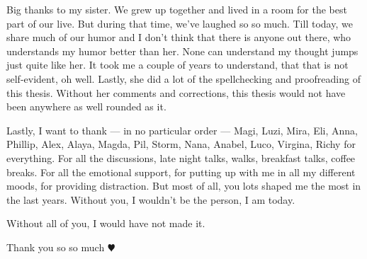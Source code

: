 Big thanks to my sister. We grew up together and lived in a room for the best part of our live. But
during that time, we've laughed so so much. Till today, we share much of our humor and I don't think
that there is anyone out there, who understands my humor better than her. None can understand my
thought jumps just quite like her. It took me a couple of years to understand, that that is not
self-evident, oh well. Lastly, she did a lot of the spellchecking and proofreading of this thesis.
Without her comments and corrections, this thesis would not have been anywhere as well rounded as
it.

Lastly, I want to thank --- in no particular order --- Magi, Luzi, Mira, Eli, Anna, Phillip, Alex,
Alaya, Magda, Pil, Storm, Nana, Anabel, Luco, Virgina, Richy for everything. For all the
discussions, late night talks, walks, breakfast talks, coffee breaks. For all the emotional support,
for putting up with me in all my different moods, for providing distraction. But most of all, you
lots shaped me the most in the last years. Without you, I wouldn't be the person, I am today.

Without all of you, I would have not made it.

\begin{flushright}
    Thank you so so much \(\varheartsuit\)
\end{flushright}
